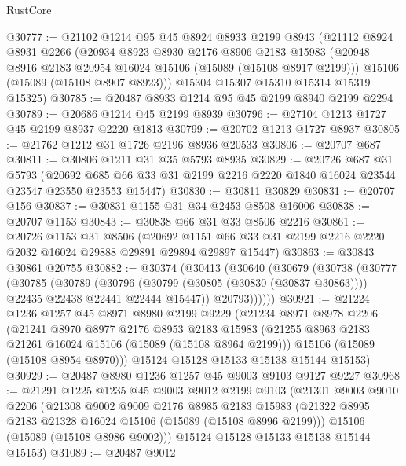\begin{lexlean}{RustCore}
\begin{coremodule}
@30777 := @21102
    @1214
    @95
    @45
    @8924
    @8933
    @2199
    @8943
    (@21112
      @8924
      @8931
      @2266
      (@20934
        @8923
        @8930
        @2176
        @8906
        @2183
        @15983
        (@20948 @8916 @2183 @20954 @16024 @15106 (@15089 (@15108 @8917 @2199)))
        @15106
        (@15089 (@15108 @8907 @8923)))
      @15304
      @15307
      @15310
      @15314
      @15319
      @15325)
@30785 := @20487 @8933 @1214 @95 @45 @2199 @8940 @2199 @2294
@30789 := @20686 @1214 @45 @2199 @8939
@30796 := @27104 @1213 @1727 @45 @2199 @8937 @2220 @1813
@30799 := @20702 @1213 @1727 @8937
@30805 := @21762 @1212 @31 @1726 @2196 @8936 @20533
@30806 := @20707 @687
@30811 := @30806 @1211 @31 @35 @5793 @8935
@30829 := @20726
    @687
    @31
    @5793
    (@20692 @685 @66 @33 @31 @2199 @2216 @2220 @1840 @16024 @23544 @23547 @23550 @23553 @15447)
@30830 := @30811 @30829
@30831 := @20707 @156
@30837 := @30831 @1155 @31 @34 @2453 @8508 @16006
@30838 := @20707 @1153
@30843 := @30838 @66 @31 @33 @8506 @2216
@30861 := @20726
    @1153
    @31
    @8506
    (@20692 @1151 @66 @33 @31 @2199 @2216 @2220 @2032 @16024 @29888 @29891 @29894 @29897 @15447)
@30863 := @30843 @30861 @20755
@30882 := @30374
    (@30413
      (@30640
        (@30679
          (@30738
            (@30777
              (@30785
                (@30789
                  (@30796
                    (@30799 (@30805 (@30830 (@30837 @30863))))
                    @22435
                    @22438
                    @22441
                    @22444
                    @15447))
                @20793))))))
@30921 := @21224
    @1236
    @1257
    @45
    @8971
    @8980
    @2199
    @9229
    (@21234
      @8971
      @8978
      @2206
      (@21241
        @8970
        @8977
        @2176
        @8953
        @2183
        @15983
        (@21255 @8963 @2183 @21261 @16024 @15106 (@15089 (@15108 @8964 @2199)))
        @15106
        (@15089 (@15108 @8954 @8970)))
      @15124
      @15128
      @15133
      @15138
      @15144
      @15153)
@30929 := @20487 @8980 @1236 @1257 @45 @9003 @9103 @9127 @9227
@30968 := @21291
    @1225
    @1235
    @45
    @9003
    @9012
    @2199
    @9103
    (@21301
      @9003
      @9010
      @2206
      (@21308
        @9002
        @9009
        @2176
        @8985
        @2183
        @15983
        (@21322 @8995 @2183 @21328 @16024 @15106 (@15089 (@15108 @8996 @2199)))
        @15106
        (@15089 (@15108 @8986 @9002)))
      @15124
      @15128
      @15133
      @15138
      @15144
      @15153)
@31089 := @20487
    @9012

\end{coremodule}
\end{lexlean}
